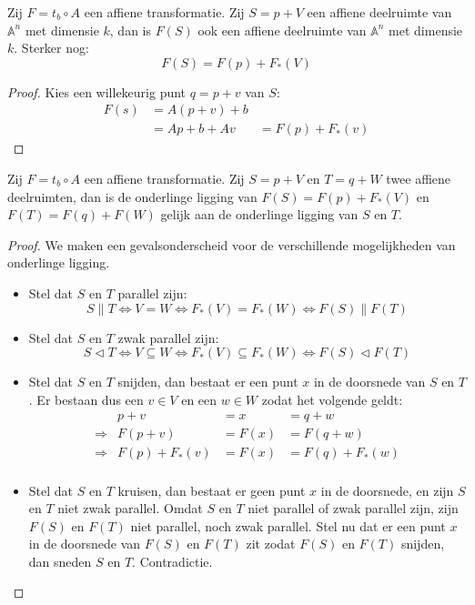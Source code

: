 \documentclass[main.tex]{subfiles}
\begin{document}
\begin{st}
  \label{st:affiene-transformatie-deelruimte-invariant}
  Zij $F = t_{b} \circ A$ een affiene transformatie.
  Zij $S = p+V$ een affiene deelruimte van $\mathbb{A}^{n}$ met dimensie $k$, dan is $F(S)$ ook een affiene deelruimte van $\mathbb{A}^{n}$ met dimensie $k$.
  Sterker nog:
  \[ F(S) = F(p) + F_{*}(V) \]

  \begin{proof}
    Kies een willekeurig punt $q= p+v$ van $S$:
    \[
    \begin{array}{rll}
    F(s) &= A(p+v) + b &\\
         &= Ap + b + Av &= F(p) + F_{*}(v)      
    \end{array}
    \]
  \end{proof}
\end{st}

\begin{st}
  Zij $F = t_{b} \circ A$ een affiene transformatie.
  Zij $S= p+V$ en $T= q+W$ twee affiene deelruimten, dan is de onderlinge ligging van $F(S) = F(p) + F_{*}(V)$ en $F(T) = F(q) + F(W)$ gelijk aan de onderlinge ligging van $S$ en $T$.  

  \begin{proof}
    We maken een gevalsonderscheid voor de verschillende mogelijkheden van onderlinge ligging.
    \begin{itemize}
    \item Stel dat $S$ en $T$ parallel zijn:
      \[ S \parallel T \Leftrightarrow V = W \Leftrightarrow F_{*}(V)=F_{*}(W) \Leftrightarrow F(S) \parallel F(T) \]
    \item Stel dat $S$ en $T$ zwak parallel zijn:
      \[ S \triangleleft T \Leftrightarrow V \subseteq W \Leftrightarrow F_{*}(V)\subseteq F_{*}(W) \Leftrightarrow F(S) \triangleleft F(T) \]
    \item Stel dat $S$ en $T$ snijden, dan bestaat er een punt $x$ in de doorsnede van $S$ en $T$.
      Er bestaan dus een $v\in V$ en een $w \in W$ zodat het volgende geldt:
      \[
      \begin{array}{rrll}
                      & p + v  &= x   &= q + w\\
         \Rightarrow  & F(p+v) &=F(x) &= F(q+w)\\
         \Rightarrow  & F(p)+F_{*}(v) &= F(x) &= F(q)+F_{*}(w)\\
      \end{array}
      \]
    \item Stel dat $S$ en $T$ kruisen, dan bestaat er geen punt $x$ in de doorsnede, en zijn $S$ en $T$ niet zwak parallel.
      Omdat $S$ en $T$ niet parallel of zwak parallel zijn, zijn $F(S)$ en $F(T)$ niet parallel, noch zwak parallel.
      Stel nu dat er een punt $x$ in de doorsnede van $F(S)$ en $F(T)$ zit zodat $F(S)$ en $F(T)$ snijden, dan sneden $S$ en $T$.
      Contradictie.
    \end{itemize}
  \end{proof}
\end{st}
\end{document}
